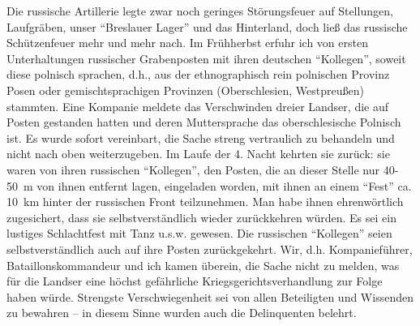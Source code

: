
Die russische Artillerie legte zwar noch geringes Störungsfeuer auf Stellungen, Laufgräben, unser \enquote{Breslauer Lager} und das Hinterland, doch ließ das russische Schützenfeuer mehr und mehr nach. Im Frühherbst erfuhr ich von ersten Unterhaltungen russischer Grabenposten mit ihren deutschen \enquote{Kollegen}, soweit diese polnisch sprachen, d.h., aus der ethnographisch rein polnischen Provinz Posen oder gemischtsprachigen Provinzen (Oberschlesien, Westpreußen) stammten. Eine Kompanie meldete das Verschwinden dreier Landser, die auf Posten gestanden hatten und deren Muttersprache das oberschlesische Polnisch ist. Es wurde sofort vereinbart, die Sache streng vertraulich zu behandeln und nicht nach oben weiterzugeben. Im Laufe der 4. Nacht kehrten sie zurück: sie waren von ihren russischen \enquote{Kollegen}, den Posten, die an dieser Stelle nur 40-50~m von ihnen entfernt lagen, eingeladen worden, mit ihnen an einem \enquote{Fest} ca. 10~km hinter der russischen Front teilzunehmen. Man habe ihnen ehrenwörtlich zugesichert, dass sie selbstverständlich wieder zurückkehren würden. Es sei ein lustiges Schlachtfest mit Tanz u.s.w. gewesen. Die russischen \enquote{Kollegen} seien selbstverständlich auch auf ihre Posten zurückgekehrt. Wir, d.h. Kompanieführer, Bataillonskommandeur und ich kamen überein, die Sache nicht zu melden, was für die Landser eine höchst gefährliche Kriegsgerichtsverhandlung zur Folge haben würde. Strengste Verschwiegenheit sei von allen Beteiligten und Wissenden zu bewahren -- in diesem Sinne wurden auch die Delinquenten belehrt.

